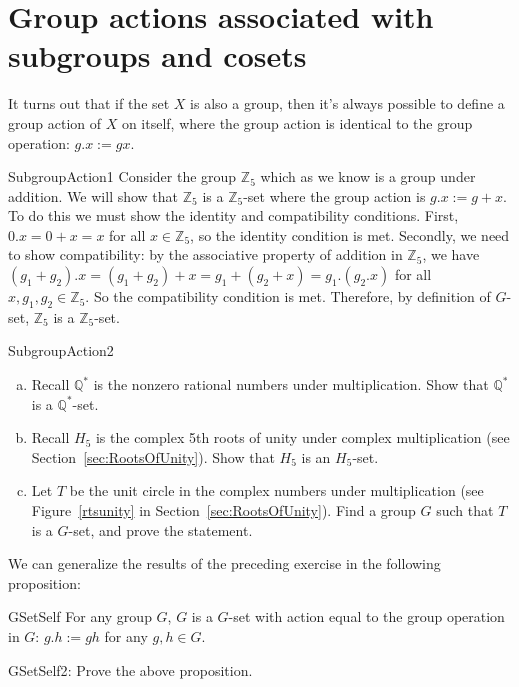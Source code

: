\section{Group actions associated with subgroups and cosets}\label{SubgroupsAndCosets}
It turns out that if the set $X$ is also a group, then it's always possible to define a group action of $X$ on itself, where the group action is identical to the group operation: $g.x:=gx$.

\begin{example}{SubgroupAction1}
Consider the group $\mathbb{Z}_5$ which as we know is a group under addition. We will show that $\mathbb{Z}_5$ is a $\mathbb{Z}_5$-set where the group action is $g.x := g+x$. To do this we must show the identity and compatibility conditions. First, $0.x = 0+x = x$ for all $x \in\mathbb {Z}_5$, so the identity condition is met.  Secondly, we need to show compatibility: by the associative property of addition in $\mathbb {Z}_5$, we have $(g_1+g_2).x = (g_1+g_2)+x  = g_1+(g_2+x) = g_1.(g_2.x)$ for all $x, g_1,g_2 \in\mathbb{ Z}_5$. So the compatibility condition is met.  Therefore, by definition of $G$-set, $\mathbb{Z}_5$ is a $\mathbb{Z}_5$-set.
\end {example}

\begin{exercise}{SubgroupAction2}
\begin{enumerate} [(a)]
\item Recall $\mathbb{ Q}^* $ is the nonzero rational numbers under multiplication. Show that $\mathbb{ Q}^* $ is a $\mathbb{ Q}^* $-set.
\item Recall $H_5$ is the complex 5th roots of unity under complex multiplication (see Section~\ref{sec:RootsOfUnity}). Show that $H_5$ is an $H_5$-set.
\item Let $T$ be the unit circle in the complex numbers under multiplication (see Figure~\ref{rtsunity} in Section~\ref{sec:RootsOfUnity}).  Find a group $G$ such that $T$ is a $G$-set, and prove the statement.
\end{enumerate}
\end {exercise}
We can generalize the results of the preceding exercise in the following proposition:

\begin{prop}{GSetSelf} 
For any group $G$, $G$ is a $G$-set with action equal to the group operation in $G$: $g.h:=gh$ for any $g,h \in G$.
\end{prop}

\begin{exercise}{GSetSelf2}: 
Prove the above proposition.
\end {exercise}

